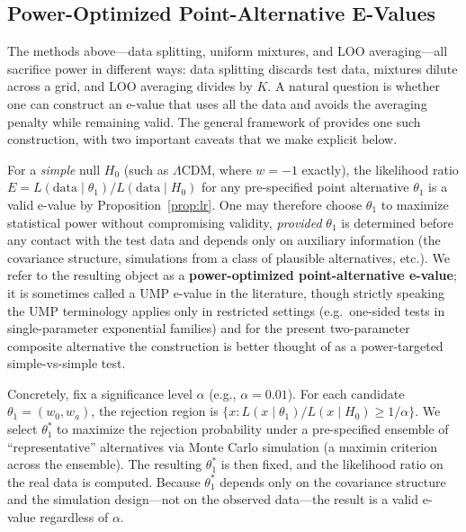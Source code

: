 \documentclass[11pt,a4paper]{article}
\newcommand{\LCDM}{$\Lambda$CDM}
\begin{document}
\subsection{Power-Optimized Point-Alternative E-Values}
\label{sec:ump_theory}

The methods above---data splitting, uniform mixtures, and LOO averaging---all sacrifice power in different ways: data splitting discards test data, mixtures dilute across a grid, and LOO averaging divides by $K$. A natural question is whether one can construct an e-value that uses all the data and avoids the averaging penalty while remaining valid. The general framework of \citet{GrunwaldSafeTesting2024} provides one such construction, with two important caveats that we make explicit below.

For a \textit{simple} null $H_0$ (such as \LCDM, where $w = -1$ exactly), the likelihood ratio $E = L(\text{data} \mid \theta_1) / L(\text{data} \mid H_0)$ for any pre-specified point alternative $\theta_1$ is a valid e-value by Proposition~\ref{prop:lr}. One may therefore choose $\theta_1$ to maximize statistical power without compromising validity, \emph{provided} $\theta_1$ is determined before any contact with the test data and depends only on auxiliary information (the covariance structure, simulations from a class of plausible alternatives, etc.). We refer to the resulting object as a \textbf{power-optimized point-alternative e-value}; it is sometimes called a UMP e-value in the literature, though strictly speaking the UMP terminology applies only in restricted settings (e.g.\ one-sided tests in single-parameter exponential families) and for the present two-parameter composite alternative the construction is better thought of as a power-targeted simple-vs-simple test.

Concretely, fix a significance level $\alpha$ (e.g., $\alpha = 0.01$). For each candidate $\theta_1 = (w_0, w_a)$, the rejection region is $\{x : L(x \mid \theta_1)/L(x \mid H_0) \geq 1/\alpha\}$. We select $\theta_1^*$ to maximize the rejection probability under a pre-specified ensemble of ``representative'' alternatives via Monte Carlo simulation (a maximin criterion across the ensemble). The resulting $\theta_1^*$ is then fixed, and the likelihood ratio on the real data is computed. Because $\theta_1^*$ depends only on the covariance structure and the simulation design---not on the observed data---the result is a valid e-value regardless of $\alpha$.
\end{document}
